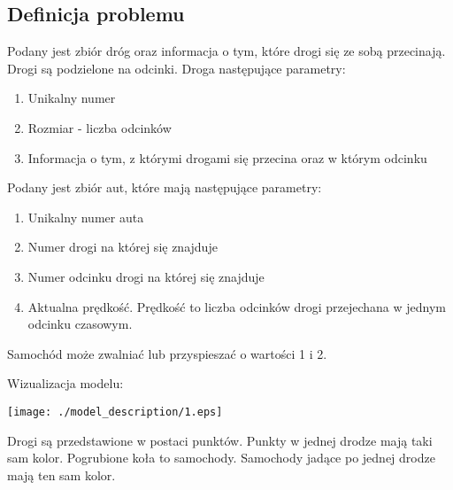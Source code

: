 \documentclass[../main.tex]{subfiles}
\begin{document}
 
\begin{figure}[bh]
\centering
 
\end{figure}

\subsection{Definicja problemu}

Podany jest zbiór dróg oraz informacja o tym, które drogi się ze sobą przecinają. Drogi są podzielone na odcinki.
Droga następujące parametry:

\begin{enumerate}  
\item Unikalny numer
\item Rozmiar - liczba odcinków
\item Informacja o tym, z którymi drogami się przecina oraz w którym odcinku
\end{enumerate}


Podany jest zbiór aut, które mają następujące parametry:

\begin{enumerate}  
\item Unikalny numer auta
\item Numer drogi na której się znajduje
\item Numer odcinku drogi na której się znajduje
\item Aktualna prędkość. Prędkość to liczba odcinków drogi przejechana w jednym odcinku czasowym.
\end{enumerate}

Samochód może zwalniać lub przyspieszać o wartości 1 i 2.

\newpage
Wizualizacja modelu:
\newline

\texttt{[image: ./model\_description/1.eps]}
\newline
\newline

Drogi są przedstawione w postaci punktów. Punkty w jednej drodze mają taki sam kolor. Pogrubione koła to samochody. Samochody jadące po jednej drodze mają ten sam kolor.
\end{document}

